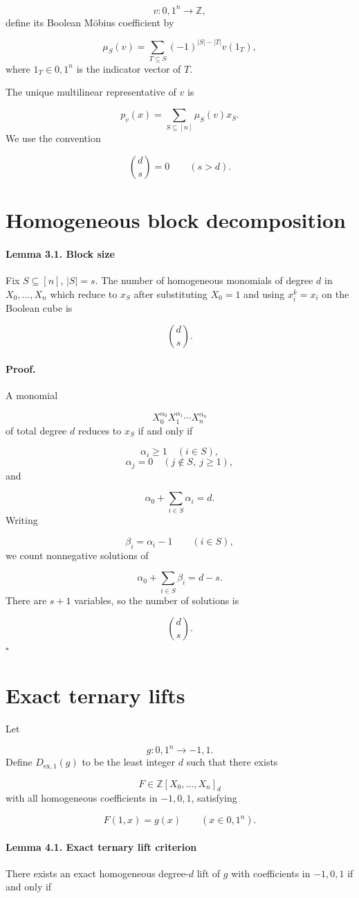 \documentclass[11pt]{article}
\theoremstyle{definition}
\begin{document}
\[
v:{0,1}^n\to\mathbb{Z},
\]
define its Boolean Möbius coefficient by

\[
\mu_S(v)
=
\sum_{T\subseteq S}
(-1)^{|S|-|T|}v(1_T),
\]
where $1_T\in{0,1}^n$ is the indicator vector of $T$.

The unique multilinear representative of $v$ is

\[
p_v(x)=\sum_{S\subseteq[n]}\mu_S(v)x_S.
\]
We use the convention

\[
\binom ds=0
\qquad(s>d).
\]
\section{Homogeneous block decomposition}
\paragraph{Lemma 3.1. Block size}
Fix $S\subseteq[n]$, $|S|=s$. The number of homogeneous monomials of degree $d$ in $X_0,\dots,X_n$ which reduce to $x_S$ after substituting $X_0=1$ and using $x_i^k=x_i$ on the Boolean cube is

\[
\binom ds.
\]
\paragraph{Proof.}
A monomial

\[
X_0^{\alpha_0}X_1^{\alpha_1}\cdots X_n^{\alpha_n}
\]
of total degree $d$ reduces to $x_S$ if and only if

\[
\alpha_i\ge1\quad(i\in S),
\]
\[
\alpha_j=0\quad(j\notin S,\ j\ge1),
\]
and

\[
\alpha_0+\sum_{i\in S}\alpha_i=d.
\]
Writing

\[
\beta_i=\alpha_i-1\qquad(i\in S),
\]
we count nonnegative solutions of

\[
\alpha_0+\sum_{i\in S}\beta_i=d-s.
\]
There are $s+1$ variables, so the number of solutions is

\[
\binom{d}{s}.
\]
\(\square\)
\section{Exact ternary lifts}
Let

\[
g:{0,1}^n\to{-1,1}.
\]
Define $D_{\mathrm{ex},1}(g)$ to be the least integer $d$ such that there exists

\[
F\in\mathbb{Z}[X_0,\dots,X_n]_d
\]
with all homogeneous coefficients in ${-1,0,1}$, satisfying

\[
F(1,x)=g(x)
\qquad(x\in{0,1}^n).
\]
\paragraph{Lemma 4.1. Exact ternary lift criterion}
There exists an exact homogeneous degree-$d$ lift of $g$ with coefficients in ${-1,0,1}$ if and only if
\end{document}
